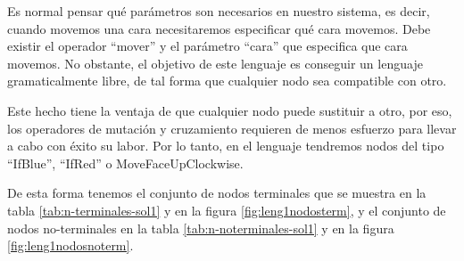 Es normal pensar qué parámetros son necesarios en nuestro sistema, es decir,
cuando movemos una cara necesitaremos especificar qué cara movemos. Debe existir
el operador “mover” y el parámetro “cara” que especifica que cara movemos. No
obstante, el objetivo de este lenguaje es conseguir un lenguaje gramaticalmente
libre, de tal forma que cualquier nodo sea compatible con otro.

Este hecho tiene la ventaja de que cualquier nodo puede sustituir a otro, por
eso, los operadores de mutación y cruzamiento requieren de menos esfuerzo para
llevar a cabo con éxito su labor. Por lo tanto, en el lenguaje tendremos nodos
del tipo “IfBlue”, “IfRed” o MoveFaceUpClockwise.

De esta forma tenemos el conjunto de nodos terminales que se muestra en la
tabla \ref{tab:n-terminales-sol1} y en la figura \ref{fig:leng1nodosterm}, y el
conjunto de nodos no-terminales en la tabla \ref{tab:n-noterminales-sol1} y en
la figura \ref{fig:leng1nodosnoterm}.


